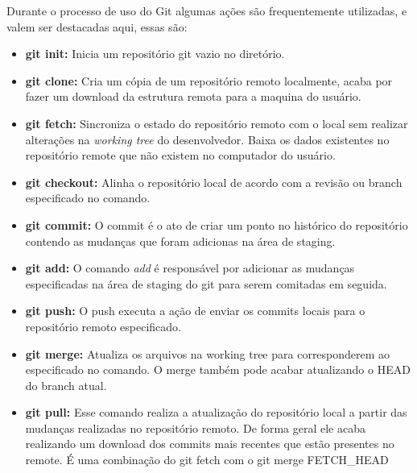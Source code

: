 	Durante o processo de uso do Git algumas ações são frequentemente utilizadas, e valem ser destacadas aqui, essas são:
	\begin{itemize}
    	\item \textbf{git init:} 
    	Inicia um repositório git vazio no diretório.
    	
    	\item \textbf{git clone:}
    	Cria um cópia de um repositório remoto localmente, acaba por fazer um download da estrutura remota para a maquina do usuário.
    	
    	\item \textbf{git fetch:}
	    Sincroniza o estado do repositório remoto com o local sem realizar alterações na \textit{working tree} do desenvolvedor. Baixa os dados existentes no repositório remote que não existem no computador do usuário.
	
    	\item \textbf{git checkout:}
    	Alinha o repositório local de acordo com a revisão ou branch especificado no comando.
    	
    	\item \textbf{git commit:}
    	O commit é o ato de criar um ponto no histórico do repositório contendo as mudanças que foram adicionas na área de staging.
    	
    	\item \textbf{git add:}
    	O comando \textit{add} é responsável por adicionar as mudanças especificadas na área de staging do git para serem comitadas em seguida.
    	
    	\item \textbf{git push:}
    	O push executa a ação de enviar os commits locais para o repositório remoto especificado.
    	
    	\item \textbf{git merge:}
    	Atualiza os arquivos na working tree para corresponderem ao especificado no comando. O merge também pode acabar atualizando o HEAD do branch atual.
    	
    	\item \textbf{git pull:}
    	Esse comando realiza a atualização do repositório local a partir das mudanças realizadas no repositório remoto. De forma geral ele acaba realizando um download dos commits mais recentes que estão presentes no remote. É uma combinação do git fetch com o git merge FETCH\_HEAD
	\end{itemize}
